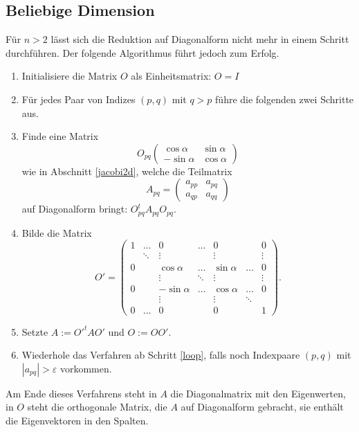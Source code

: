 \subsection{Beliebige Dimension}
Für $n>2$ lässt sich die Reduktion auf Diagonalform nicht mehr in einem
Schritt durchführen. Der folgende Algorithmus führt jedoch zum Erfolg.
\begin{enumerate}
\item Initialisiere die Matrix $O$ als Einheitsmatrix: $O=I$
\item \label{loop} Für jedes Paar von Indizes $(p,q)$ mit $q>p$ führe
die folgenden zwei Schritte aus.
\item Finde eine Matrix
\[
O_{pq}\begin{pmatrix}
 \cos\alpha&\sin\alpha\\
-\sin\alpha&\cos\alpha
\end{pmatrix}
\]
wie in Abschnitt \ref{jacobi2d}, welche die Teilmatrix
\[
A_{pq}=\begin{pmatrix}a_{pp}&a_{pq}\\a_{qp}&a_{qq}\end{pmatrix}
\]
auf Diagonalform bringt: $O_{pq}^tA_{pq}O_{pq}$.
\item Bilde die Matrix
\[
O'=\begin{pmatrix}
1 &\dots &0         &\dots &0          &      &0\\
  &\ddots&\vdots    &      &\vdots     &      &\vdots\\
0 &      &\cos\alpha&\dots &\sin\alpha&\dots &0\\
  &      &\vdots    &\ddots&\vdots     &      &\vdots\\
0 &      &-\sin\alpha&\dots & \cos\alpha&\dots &0\\
  &      &\vdots    &      & \vdots    &\ddots& \\
0 &\dots &0         &      & 0         &      &1
\end{pmatrix}.
\]
\item Setzte $A:=O'^tAO'$ und $O:=OO'$.
\item Wiederhole das Verfahren ab Schritt \ref{loop}, falls noch Indexpaare
$(p,q)$ mit $|a_{pq}|>\varepsilon$ vorkommen.
\end{enumerate}
Am Ende dieses Verfahrens steht in $A$ die Diagonalmatrix mit den
Eigenwerten, in $O$ steht die orthogonale Matrix, die $A$ auf
Diagonalform gebracht, sie enthält die Eigenvektoren in den
Spalten.

